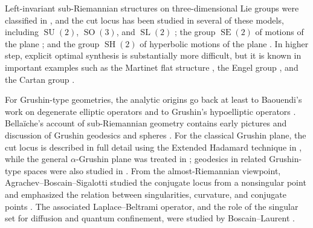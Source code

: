 \documentclass[12pt]{amsart}
\numberwithin{equation}{section}
\theoremstyle{plain}
\theoremstyle{definition}
\theoremstyle{remark}
\begin{document}
Left-invariant sub-Riemannian structures on three-dimensional Lie groups were classified
in \cite{AgrachevBarilari2012}, and the cut locus has been studied in several of these
models, including \(\operatorname{SU}(2)\), \(\operatorname{SO}(3)\), and
\(\operatorname{SL}(2)\) \cite{BoscainRossi2008a}; the group
\(\operatorname{SE}(2)\) of motions of the plane
\cite{MoiseevSachkov2010, Sachkov2010a, Sachkov2011}; and the group
\(\operatorname{SH}(2)\) of hyperbolic motions of the plane
\cite{ButtSachkovBhatti2014, ButtSachkovBhatti2016, ButtSachkovBhatti2017}. In higher
step, explicit optimal synthesis is substantially more difficult, but it is known in
important examples such as the Martinet flat structure
\cite{AgrachevBonnardChybaKupka1997}, the Engel group
\cite{ArdentovSachkov2011, ArdentovSachkov2013, ArdentovSachkov2015,
    ArdentovSachkov2017}, and the Cartan group
\cite{Sachkov2021a, ArdentovHakavuori2022}.

For Grushin-type geometries, the analytic origins go back at least to Baouendi's work on
degenerate elliptic operators \cite{Baouendi1967} and to Grushin's hypoelliptic
operators \cite{Grushin1970}. Bellaïche's account of sub-Riemannian geometry contains
early pictures and discussion of Grushin geodesics and spheres \cite{Bellaiche1996}.
For the classical Grushin plane, the cut locus is described in full detail using the Extended Hadamard technique in
\cite[Chapter~13]{AgrachevBarilariBoscainBook2020}, while the general
\(\alpha\)-Grushin plane was treated in \cite{Borza2022}; geodesics in related
Grushin-type spaces were also studied in \cite{ChangLi2012,changli2014}. From the
almost-Riemannian viewpoint, Agrachev--Boscain--Sigalotti studied the conjugate locus
from a nonsingular point and emphasized the relation between singularities, curvature,
and conjugate points \cite{AgrachevBoscainSigalotti2008}. The associated
Laplace--Beltrami operator, and the role of the singular set for diffusion and quantum
confinement, were studied by Boscain--Laurent \cite{BoscainLaurent2013}.

\end{document}
